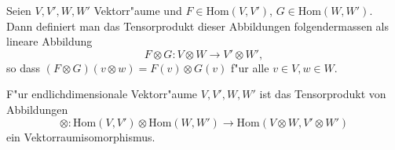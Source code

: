 \documentclass[9pt, a4paper, twocolumn, landscape]{article}
\newcommand{\comment}[1]{}
\begin{document}
\comment{
\begin{theorem}
Ist $\mathrm{dim}V < \infty$, so ist $(1a)$ ein Isomorphismus und falls zus"atzlich $\mathrm{char}K = 2$, so ist $(1s)$ auch ein Isomorphismus.
\end{theorem}
}

\begin{definition}
Seien $V, V', W, W'$ Vektorr"aume und $F \in \mathrm{Hom}(V, V')$, $G \in \mathrm{Hom}(W, W')$. Dann definiert man das Tensorprodukt dieser Abbildungen folgendermassen als lineare Abbildung
$$
F \otimes G: V \otimes W \rightarrow V' \otimes W',
$$
so dass $(F \otimes G)(v \otimes w) = F(v) \otimes G(v)$ f"ur alle $v\in V, w \in W$.
\end{definition}

\begin{theorem}
F"ur endlichdimensionale Vektorr"aume $V, V', W, W'$ ist das Tensorprodukt von Abbildungen 
$$
\otimes: \mathrm{Hom}(V, V') \otimes  \mathrm{Hom}(W, W') \rightarrow \mathrm{Hom}(V \otimes W, V' \otimes W')
$$
ein Vektorraumisomorphismus.
\end{theorem}
\end{document}
